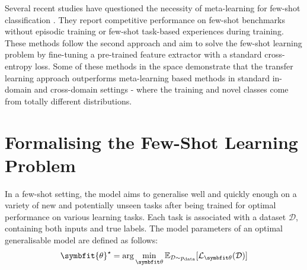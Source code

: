 Several recent studies have questioned the necessity of meta-learning for few-shot classification \parencite{goodemballneed2020, Medina2020Self-SupervisedClassification, dhillon2019baseline, ziko2020laplacian, boudiaf2020information,chen2021self}. They report competitive performance on few-shot benchmarks without episodic training or few-shot task-based experiences during training. These methods follow the second approach and aim to solve the few-shot learning problem by fine-tuning a pre-trained feature extractor with a standard cross-entropy loss.
Some of these methods \parencite{Medina2020Self-SupervisedClassification, goodemballneed2020, das2022confess} in the space demonstrate that the transfer learning approach outperforms meta-learning based methods in standard in-domain and cross-domain settings - where the training and novel classes come from totally different distributions.

\section{Formalising the Few-Shot Learning Problem}\label{sec:formalising-fsl}

In a few-shot setting, the model aims to generalise well and quickly enough on a variety of new and potentially unseen tasks after being trained for optimal performance on various learning tasks.
Each task is associated with a dataset $\mathcal{D}$, containing both inputs and true labels. 
The model parameters of an optimal generalisable model are defined as follows:
\begin{equation}
    \symbfit{\theta}^\star = \arg\min_{\symbfit \theta} \mathbb{E}_{\mathcal{D}\sim \pdata} [\mathcal{L}_{\symbfit \theta}(\mathcal{D})]
\end{equation}

